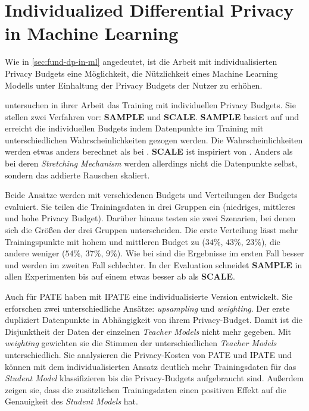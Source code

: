\section{Individualized Differential Privacy in Machine Learning}\label{sec:rw-idp-ml}

Wie in \autoref{sec:fund-dp-in-ml} angedeutet, ist die Arbeit mit individualisierten Privacy Budgets eine Möglichkeit, die Nützlichkeit eines Machine Learning Modells unter Einhaltung der Privacy Budgets der Nutzer zu erhöhen.

\textcite{boenisch:2023} untersuchen in ihrer Arbeit das Training mit individuellen Privacy Budgets. Sie stellen zwei Verfahren vor: \textbf{SAMPLE} und \textbf{SCALE}. \textbf{SAMPLE} basiert auf \textcite{jorgensen:2015} und erreicht die individuellen Budgets indem Datenpunkte im Training mit unterschiedlichen Wahrscheinlichkeiten gezogen werden. Die Wahrscheinlichkeiten werden etwas anders berechnet als bei \textcite{jorgensen:2015}. \textbf{SCALE} ist inspiriert von \textcite{alaggan:2016}. Anders als bei deren \textit{Stretching Mechanism} werden allerdings nicht die Datenpunkte selbst, sondern das addierte Rauschen skaliert. 

Beide Ansätze werden mit verschiedenen Budgets und Verteilungen der Budgets evaluiert. Sie teilen die Trainingsdaten in drei Gruppen ein (niedriges, mittleres und hohe Privacy Budget). Darüber hinaus testen sie zwei Szenarien, bei denen sich die Größen der drei Gruppen unterscheiden. Die erste Verteilung lässt mehr Trainingspunkte mit hohem und mittleren Budget zu ($34\%$, $43\%$, $23\%$), die andere weniger ($54\%$, $37\%$, $9\%$). Wie bei \textcite{jorgensen:2015} sind die Ergebnisse im ersten Fall besser und werden im zweiten Fall schlechter. In der Evaluation schneidet \textbf{SAMPLE} in allen Experimenten bis auf einem etwas besser ab als \textbf{SCALE}.

Auch für PATE haben \textcite{boenisch:2023b} mit IPATE eine individualisierte Version entwickelt. Sie erforschen zwei unterschiedliche Ansätze: \textit{upsampling} und \textit{weighting}. Der erste dupliziert Datenpunkte in Abhängigkeit von ihrem Privacy-Budget. Damit ist die Disjunktheit der Daten der einzelnen \textit{Teacher Models} nicht mehr gegeben. Mit \textit{weighting} gewichten sie die Stimmen der unterschiedlichen \textit{Teacher Models} unterschiedlich. Sie analysieren die Privacy-Kosten von PATE und IPATE und können mit dem individualisierten Ansatz deutlich mehr Trainingsdaten für das \textit{Student Model} klassifizieren bis die Privacy-Budgets aufgebraucht sind. Außerdem zeigen sie, dass die zusätzlichen Trainingsdaten einen positiven Effekt auf die Genauigkeit des \textit{Student Models} hat.

